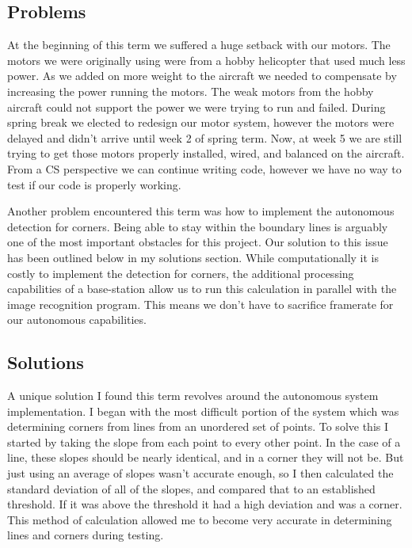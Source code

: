 \documentclass[onecolumn, draftclsnofoot,10pt, compsoc]{IEEEtran}
\begin{document}
\subsection{Problems}

At the beginning of this term we suffered a huge setback with our motors. The motors we were originally using were from a hobby helicopter that used much less power. As we added on more weight to the aircraft we needed to compensate by increasing the power running the motors. The weak motors from the hobby aircraft could not support the power we were trying to run and failed. During spring break we elected to redesign our motor system, however the motors were delayed and didn’t arrive until week 2 of spring term. Now, at week 5 we are still trying to get those motors properly installed, wired, and balanced on the aircraft. From a CS perspective we can continue writing code, however we have no way to test if our code is properly working.

Another problem encountered this term was how to implement the autonomous detection for corners. Being able to stay within the boundary lines is arguably one of the most important obstacles for this project. Our solution to this issue has been outlined below in my solutions section. While computationally it is costly to implement the detection for corners, the additional processing capabilities of a base-station allow us to run this calculation in parallel with the image recognition program. This means we don't have to sacrifice framerate for our autonomous capabilities. 

\subsection{Solutions}

A unique solution I found this term revolves around the autonomous system implementation. I began with the most difficult portion of the system which was determining corners from lines from an unordered set of points. To solve this I started by taking the slope from each point to every other point. In the case of a line, these slopes should be nearly identical, and in a corner they will not be. But just using an average of slopes wasn’t accurate enough, so I then calculated the standard deviation of all of the slopes, and compared that to an established threshold. If it was above the threshold it had a high deviation and was a corner. This method of calculation allowed me to become very accurate in determining lines and corners during testing.
\end{document}
